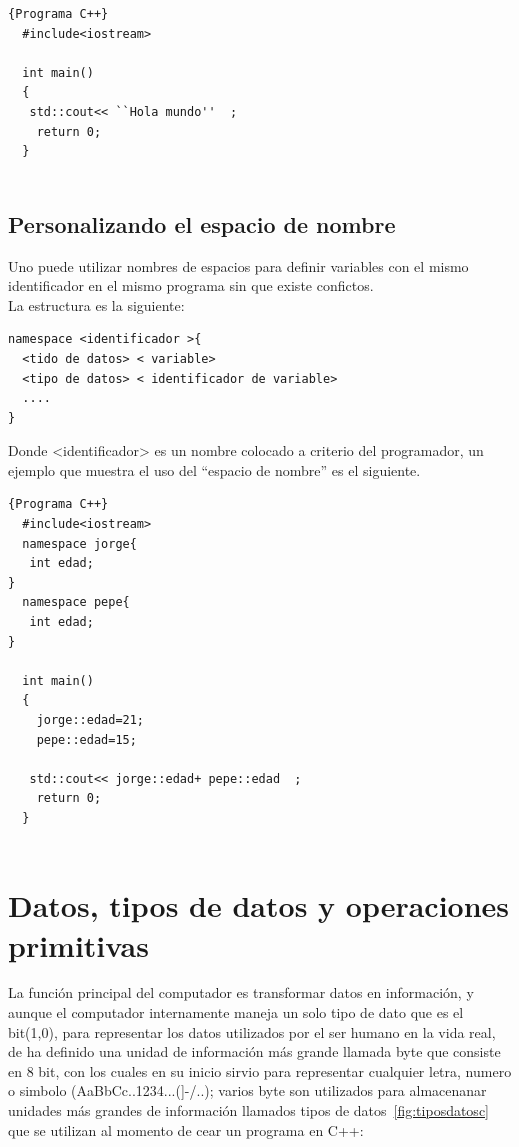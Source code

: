 \documentclass[a4paper,12pt,spanish]{article}
\begin{document}
\begin{lstlisting}[frame=trBL]{Programa C++}
  #include<iostream>

  int main()
  {
   std::cout<< ``Hola mundo''  ;
    return 0;
  }
  
\end{lstlisting}

\subsection{Personalizando el espacio de nombre}
\label{sec:pers-el-espac}
Uno puede utilizar nombres de espacios para definir variables
con el mismo identificador en el mismo programa sin que existe confictos. \\

La estructura es la siguiente:

\begin{verbatim}
namespace <identificador >{
  <tido de datos> < variable>
  <tipo de datos> < identificador de variable>
  ....
}
\end{verbatim}

Donde <identificador> es un nombre colocado a criterio del programador, un ejemplo que muestra el uso del ``espacio de nombre'' es el siguiente.\\

\begin{lstlisting}[frame=trBL,firstnumber=1]{Programa C++}
  #include<iostream>
  namespace jorge{
   int edad;
}
  namespace pepe{
   int edad;
}
  
  int main()
  {
    jorge::edad=21;
    pepe::edad=15;
 
   std::cout<< jorge::edad+ pepe::edad  ;
    return 0;
  }
  
\end{lstlisting}


\section{Datos, tipos de datos y operaciones primitivas}
\label{sec:datos-tipo-opera}

La función principal del computador es transformar datos en información, y aunque el computador internamente maneja un solo tipo de dato que es el bit(1,0), para representar los datos utilizados por el ser humano en la vida real, de ha definido una unidad de información más grande llamada byte que consiste en 8 bit, con los cuales en su inicio sirvio para representar cualquier letra, numero o simbolo (AaBbCc..1234...(]-/..); varios byte son utilizados para almacenanar unidades más grandes de información llamados tipos de datos~\ref{fig:tiposdatosc} que se utilizan al momento de cear un programa en C++:\\
\end{document}
